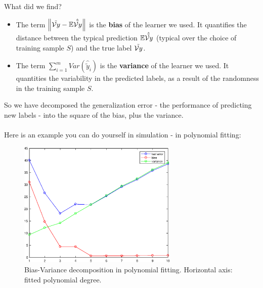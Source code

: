        What did we find?
       \begin{itemize}
         \item The term $\left\| \tilde{\mathcal{V}{y}}-\mathbb{E}\hat{\tilde{\mathcal{V}{y}}} \right\|$ is the
           {\bf bias} of the learner we used. It quantifies the distance between
           the typical prediction $\mathbb{E}\hat{\tilde{\mathcal{V}{y}}}$ (typical over the choice of
           training sample $S$) and the true label
           $\tilde{\mathcal{V}{y}}$.
         \item The term $\sum_{i=1}^m Var(\hat{\tilde{y}}_i)$ is the {\bf
           variance} of the learner we used. It quantities the variability in
           the predicted labels,  as a result of the randomness in the training
           sample $S$.

       \end{itemize}

       So we have decomposed the generalization error - the performance of
       predicting new labels - into 
       the square of the bias, plus the variance.
\\~\\
       Here is an example you can do yourself in simulation - in polynomial
       fitting:


\begin{figure}[H]
  \centering
  \includegraphics[width=3in]{poly_bias_variance.eps}
  \caption{Bias-Variance decomposition in polynomial fitting. Horizontal axis:
  fitted polynomial degree.}
\end{figure}

